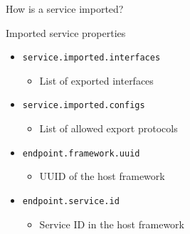 \begin{frame}{How is a service imported?}
\begin{block}{Imported service properties}
\begin{itemize}
\item[] \texttt{\small service.imported.interfaces}
\begin{itemize}
\vspace{-.2em}
\item[] List of exported interfaces
\end{itemize}
\item[] \texttt{\small service.imported.configs}
\begin{itemize}
\vspace{-.2em}
\item[] List of allowed export protocols
\end{itemize}
\item[] \texttt{\small endpoint.framework.uuid}
\begin{itemize}
\vspace{-.2em}
\item[] UUID of the host framework
\end{itemize}
\item[] \texttt{\small endpoint.service.id}
\begin{itemize}
\vspace{-.2em}
\item[] Service ID in the host framework
\end{itemize}
\end{itemize}
\end{block}
\end{frame}


